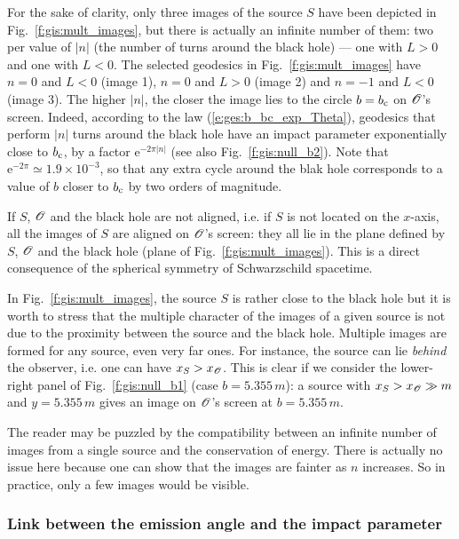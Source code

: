 For the sake of clarity, only three images of the source $S$ have been
depicted in Fig.~\ref{f:gis:mult_images}, but there is actually an infinite
number of them: two per value of $|n|$ (the number of turns around the black hole)
--- one with $L>0$ and one with $L<0$. The selected geodesics in
Fig.~\ref{f:gis:mult_images} have $n=0$ and $L<0$ (image 1), $n=0$ and $L>0$
(image 2) and $n=-1$ and $L<0$ (image 3). The higher $|n|$, the closer the image
lies to the circle $b=b_{\rm c}$ on $\mathscr{O}$'s screen. Indeed, according to the
law (\ref{e:ges:b_bc_exp_Theta}), geodesics that perform $|n|$ turns around the
black hole have an impact parameter exponentially close to $b_{\rm c}$,
by a factor $\mathrm{e}^{- 2\pi |n|}$ (see also Fig.~\ref{f:gis:null_b2}).
Note that $\mathrm{e}^{- 2\pi}\simeq 1.9\times 10^{-3}$, so that any extra cycle
around the blak hole corresponds to a value of $b$ closer to $b_{\rm c}$
by two orders of magnitude.


If $S$, $\mathscr{O}$ and the black hole are not aligned, i.e. if $S$ is not located
on the $x$-axis, all the images of $S$ are aligned on $\mathscr{O}$'s screen: they
all lie in the plane defined by $S$, $\mathscr{O}$ and the black hole (plane of
Fig.~\ref{f:gis:mult_images}). This is a direct consequence of the spherical
symmetry of Schwarzschild spacetime.

In Fig.~\ref{f:gis:mult_images}, the source $S$ is rather close to the
black hole but it is worth to stress that
the multiple character of the images of a given
source is not due to the proximity between the source and the black hole.
Multiple images are formed for any source, even very far ones.
For instance, the source can lie \emph{behind} the
observer, i.e. one can have $x_S > x_{\mathscr{O}}$. This is clear if we consider
the lower-right panel of Fig.~\ref{f:gis:null_b1} (case $b=5.355\, m$):
a source with $x_S > x_{\mathscr{O}} \gg m$ and $y=5.355\, m$ gives an image on
$\mathscr{O}$'s screen at $b=5.355\, m$.

The reader may be puzzled by the compatibility between an infinite number
of images from a single source and the conservation of energy. There is
actually no issue here because one can show that the images are
fainter as $n$ increases. So in practice, only a few images would be visible.

\subsubsection{Link between the emission angle and the impact parameter}

